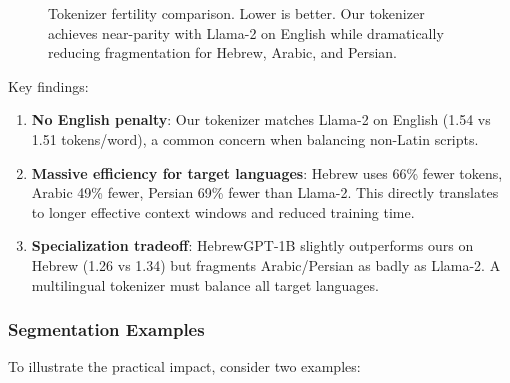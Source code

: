 \documentclass[10pt,twocolumn]{article}
\begin{document}
\begin{figure}[H]
\centering
{}
\caption{Tokenizer fertility comparison. Lower is better. Our tokenizer achieves near-parity with Llama-2 on English while dramatically reducing fragmentation for Hebrew, Arabic, and Persian.}
\label{fig:fertility}
\end{figure}

Key findings:
\begin{enumerate}
    \item \textbf{No English penalty}: Our tokenizer matches Llama-2 on English (1.54 vs 1.51 tokens/word), a common concern when balancing non-Latin scripts.
    \item \textbf{Massive efficiency for target languages}: Hebrew uses 66\% fewer tokens, Arabic 49\% fewer, Persian 69\% fewer than Llama-2. This directly translates to longer effective context windows and reduced training time.
    \item \textbf{Specialization tradeoff}: HebrewGPT-1B slightly outperforms ours on Hebrew (1.26 vs 1.34) but fragments Arabic/Persian as badly as Llama-2. A multilingual tokenizer must balance all target languages.
\end{enumerate}

\subsubsection{Segmentation Examples}

To illustrate the practical impact, consider two examples:
\end{document}
